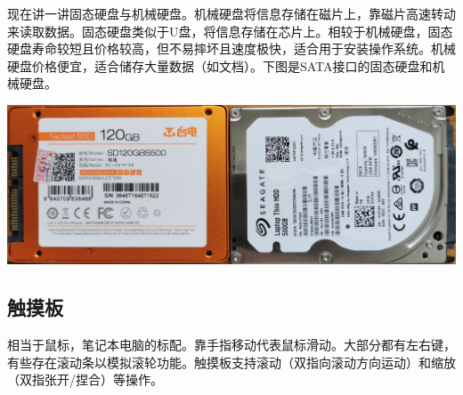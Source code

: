 现在讲一讲固态硬盘与机械硬盘。机械硬盘将信息存储在磁片上，靠磁片高速转动来读取数据。固态硬盘类似于U盘，将信息存储在芯片上。相较于机械硬盘，固态硬盘寿命较短且价格较高，但不易摔坏且速度极快，适合用于安装操作系统。机械硬盘价格便宜，适合储存大量数据（如文档）。下图是SATA接口的固态硬盘和机械硬盘。
\begin{center}
	\includegraphics[scale=0.05]{pic/HD}
\end{center} 
\subsection{触摸板}
相当于鼠标，笔记本电脑的标配。靠手指移动代表鼠标滑动。大部分都有左右键，有些存在滚动条以模拟滚轮功能。触摸板支持滚动（双指向滚动方向运动）和缩放（双指张开/捏合）等操作。
